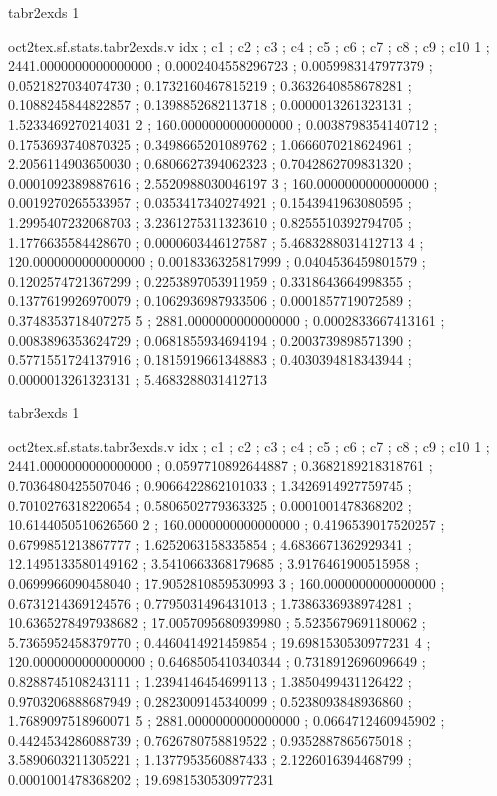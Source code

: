 \expandafter\def\csname oct2tex.sf.stats.tabr2exds.t\endcsname{tabr2exds}
\expandafter\def\csname oct2tex.sf.stats.tabr2exds.u\endcsname{1}
\begin{filecontents}[overwrite]{oct2tex.sf.stats.tabr2exds.v}
idx ; c1 ; c2 ; c3 ; c4 ; c5 ; c6 ; c7 ; c8 ; c9 ; c10
1 ; 2441.0000000000000000 ; 0.0002404558296723 ; 0.0059983147977379 ; 0.0521827034074730 ; 0.1732160467815219 ; 0.3632640858678281 ; 0.1088245844822857 ; 0.1398852682113718 ; 0.0000013261323131 ; 1.5233469270214031
2 ; 160.0000000000000000 ; 0.0038798354140712 ; 0.1753693740870325 ; 0.3498665201089762 ; 1.0666070218624961 ; 2.2056114903650030 ; 0.6806627394062323 ; 0.7042862709831320 ; 0.0001092389887616 ; 2.5520988030046197
3 ; 160.0000000000000000 ; 0.0019270265533957 ; 0.0353417340274921 ; 0.1543941963080595 ; 1.2995407232068703 ; 3.2361275311323610 ; 0.8255510392794705 ; 1.1776635584428670 ; 0.0000603446127587 ; 5.4683288031412713
4 ; 120.0000000000000000 ; 0.0018336325817999 ; 0.0404536459801579 ; 0.1202574721367299 ; 0.2253897053911959 ; 0.3318643664998355 ; 0.1377619926970079 ; 0.1062936987933506 ; 0.0001857719072589 ; 0.3748353718407275
5 ; 2881.0000000000000000 ; 0.0002833667413161 ; 0.0083896353624729 ; 0.0681855934694194 ; 0.2003739898571390 ; 0.5771551724137916 ; 0.1815919661348883 ; 0.4030394818343944 ; 0.0000013261323131 ; 5.4683288031412713
\end{filecontents}
\expandafter\def\csname oct2tex.sf.stats.tabr3exds.t\endcsname{tabr3exds}
\expandafter\def\csname oct2tex.sf.stats.tabr3exds.u\endcsname{1}
\begin{filecontents}[overwrite]{oct2tex.sf.stats.tabr3exds.v}
idx ; c1 ; c2 ; c3 ; c4 ; c5 ; c6 ; c7 ; c8 ; c9 ; c10
1 ; 2441.0000000000000000 ; 0.0597710892644887 ; 0.3682189218318761 ; 0.7036480425507046 ; 0.9066422862101033 ; 1.3426914927759745 ; 0.7010276318220654 ; 0.5806502779363325 ; 0.0001001478368202 ; 10.6144050510626560
2 ; 160.0000000000000000 ; 0.4196539017520257 ; 0.6799851213867777 ; 1.6252063158335854 ; 4.6836671362929341 ; 12.1495133580149162 ; 3.5410663368179685 ; 3.9176461900515958 ; 0.0699966090458040 ; 17.9052810859530993
3 ; 160.0000000000000000 ; 0.6731214369124576 ; 0.7795031496431013 ; 1.7386336938974281 ; 10.6365278497938682 ; 17.0057095680939980 ; 5.5235679691180062 ; 5.7365952458379770 ; 0.4460414921459854 ; 19.6981530530977231
4 ; 120.0000000000000000 ; 0.6468505410340344 ; 0.7318912696096649 ; 0.8288745108243111 ; 1.2394146454699113 ; 1.3850499431126422 ; 0.9703206888687949 ; 0.2823009145340099 ; 0.5238093848936860 ; 1.7689097518960071
5 ; 2881.0000000000000000 ; 0.0664712460945902 ; 0.4424534286088739 ; 0.7626780758819522 ; 0.9352887865675018 ; 3.5890603211305221 ; 1.1377953560887433 ; 2.1226016394468799 ; 0.0001001478368202 ; 19.6981530530977231
\end{filecontents}
